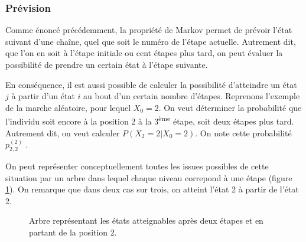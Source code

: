 \documentclass[12pt]{article}
\begin{document}
\subsubsection{Prévision}

Comme énoncé précédemment, la propriété de Markov permet de prévoir
l'état suivant d'une chaîne, quel que soit le numéro de l'étape
actuelle. Autrement dit, que l'on en soit à l'étape initiale ou cent
étapes plus tard, on peut évaluer la possibilité de prendre un certain
état à l'étape suivante.

En conséquence, il est aussi possible de calculer la possibilité
d'atteindre un état $j$ à partir d'un état $i$ au bout d'un certain
nombre d'étapes. Reprenons l'exemple de la marche aléatoire, pour
lequel $X_0 = 2$. On veut déterminer la probabilité que l'individu
soit encore à la position 2 à la 3\textsuperscript{ème} étape, soit
deux étapes plus tard. Autrement dit, on veut calculer $P(X_2 = 2 |
X_0 = 2)$. On note cette probabilité $p^{(2)}_{2,2}$ \cite{green}.

On peut représenter conceptuellement toutes les issues possibles de
cette situation par un arbre dans lequel chaque niveau correpond à une
étape (figure \ref{arbre}). On remarque que dans deux cas sur trois,
on atteint l'état 2 à partir de l'état 2.

\begin{figure}[H]
  \centering


  \caption{Arbre représentant les états atteignables après deux étapes
    et en partant de la position 2.}
  \label{arbre}

\end{figure}
\end{document}
